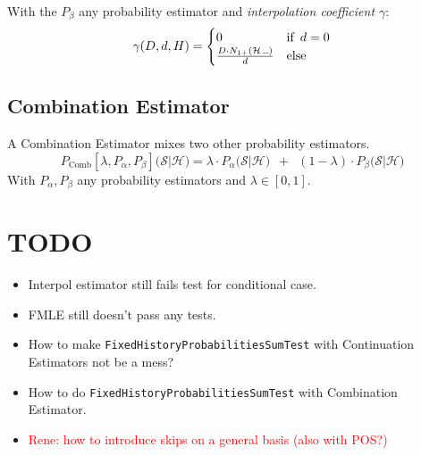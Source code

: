 \documentclass[11pt,a4paper]{article}
\newcommand{\Seq}{\mathcal{S}}
\newcommand{\Hist}{\mathcal{H}}
\newcommand{\SmallSkp}{\rule{5pt}{.3pt}}
\newcommand{\rp}[1]{\textcolor{red}{Rene: #1}}
\begin{document}
  With the $P_\beta$ any probability estimator and
  \emph{interpolation coefficient $\gamma$}:
  \begin{equation}
    \gamma(D,d,H) = \begin{cases}
      0 & \text{if} \enspace d = 0 \\
      \frac{D \cdot N_{1+}(\Hist \, \SmallSkp)}{d} & \text{else}
    \end{cases}
  \end{equation}

  \subsection{Combination Estimator}

  A Combination Estimator mixes two other probability estimators.
  \begin{equation}
    P_\mathrm{Comb}{\scriptstyle[\lambda,P_\alpha,P_\beta]}\big(\Seq | \Hist\big) = \lambda \cdot P_\alpha\big(\Seq | \Hist\big) \enspace + \enspace (1 - \lambda) \cdot P_\beta\big(\Seq | \Hist\big)
  \end{equation}
  With $P_\alpha,P_\beta$ any probability estimators and $\lambda \in [0,1]$.

  \section{TODO}

  \begin{itemize}
    \item Interpol estimator still fails test for conditional case.
    \item FMLE still doesn't pass any tests.
    \item How to make \texttt{FixedHistoryProbabilitiesSumTest} with Continuation Estimators not be a mess?
    \item How to do \texttt{FixedHistoryProbabilitiesSumTest} with Combination Estimator.
    \item \rp{how to introduce skips on a general basis (also with POS?)}
  \end{itemize}
\end{document}
